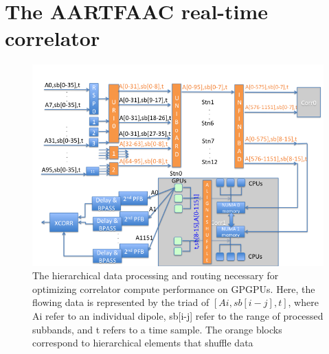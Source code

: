 \documentclass{ws-jai}
\begin{document}


\section {\label{sec:gpucorr} The AARTFAAC real-time correlator}
\begin{figure}[htbp]
\centering
\includegraphics[width=1\textwidth]{Figs/data_routing_transform_hierarchy/Slide1.png}
\caption{The hierarchical  data processing and routing  necessary for optimizing
  correlator  compute  performance   on  GPGPUs.  Here,  the   flowing  data  is
  represented by the triad of $[Ai,sb[i-j],t]$, where Ai refer to an individual
  dipole, sb[i-j] refer  to the range of  processed subbands, and t  refers to a
  time  sample.  The orange  blocks  correspond  to hierarchical  elements  that
  shuffle data }
\label{fig:afaac_station_hw}
\end{figure}
\end{document}
